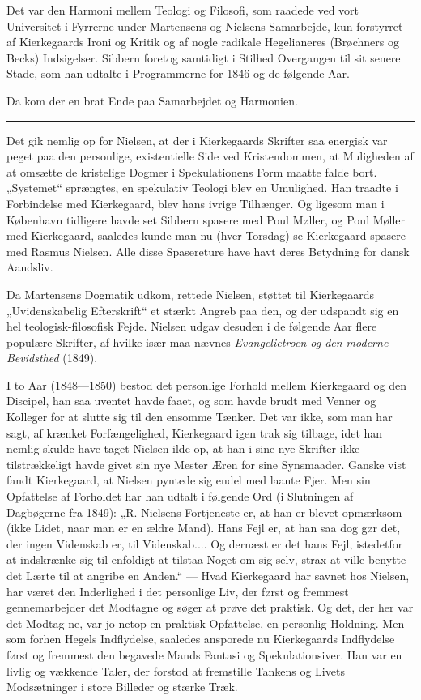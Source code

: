 \documentclass[12pt,a4paper,openany]{book}
\newcommand{\opage}[1]{\marginnote{\footnotesize\textit{[#1]}}}
\begin{document}
Det var den Harmoni mellem Teologi og Filosofi, som raadede ved vort
Universitet i Fyrrerne under Martensens og Nielsens Samarbejde, kun forstyrret
af Kierkegaards Ironi og Kritik og af nogle radikale Hegelianeres (Brøchners og
Becks) Indsigelser. Sibbern foretog samtidigt i Stilhed Overgangen til sit
senere Stade, som han udtalte i Programmerne for 1846 og de følgende Aar.

Da kom der en brat Ende paa Samarbejdet og Harmonien.

\begin{center}\rule{2cm}{0.4pt}\end{center}

\setcounter{footnote}{0}%
\opage{187}Det gik nemlig op for Nielsen, at der i Kierkegaards Skrifter saa
energisk var peget paa den personlige, existentielle Side ved Kristendommen, at
Muligheden af at omsætte de kristelige Dogmer i Spekulationens Form maatte
falde bort. „Systemet“ sprængtes, en spekulativ Teologi blev en Umulighed. Han
traadte i Forbindelse med Kierkegaard, blev hans ivrige Tilhænger. Og ligesom
man i København tidligere havde set Sibbern spasere med Poul Møller, og Poul
Møller med Kierkegaard, saaledes kunde man nu (hver Torsdag) se Kierkegaard
spasere med Rasmus Nielsen. Alle disse Spasereture have havt deres Betydning
for dansk Aandsliv.

Da Martensens Dogmatik udkom, rettede Nielsen, støttet til Kierkegaards
„Uvidenskabelig Efterskrift“ et stærkt Angreb paa den, og der udspandt sig en
hel teologisk-filosofisk Fejde. Nielsen udgav desuden i de følgende Aar flere
populære Skrifter, af hvilke især maa nævnes \textit{Evangelietroen og den
moderne Bevidsthed} (1849).

I to Aar (1848---1850) bestod det personlige Forhold mellem Kierkegaard og den
Discipel, han saa uventet havde faaet, og som havde brudt med Venner og
Kolleger for at slutte sig til den ensomme Tænker. Det var ikke, som man har
sagt, af krænket Forfængelighed, Kierkegaard igen trak sig tilbage, idet han
nemlig skulde have taget Nielsen ilde op, at han i sine nye Skrifter ikke
tilstrækkeligt havde givet sin nye Mester Æren for sine Synsmaader. Ganske vist
fandt Kierkegaard, at Nielsen pyntede sig endel med laante Fjer. Men sin
Opfattelse af Forholdet har han udtalt i følgende Ord (i Slutningen af
Dagbøgerne fra 1849): „R. Nielsens Fortjeneste er, at han er blevet opmærksom
(ikke Lidet, naar man er en ældre Mand). Hans Fejl er, at han saa dog gør det,
der ingen Videnskab er, til Videnskab.... Og dernæst er det hans Fejl,
istedetfor at indskrænke sig til enfoldigt at tilstaa Noget om sig selv, strax
at ville benytte det Lærte til at angribe en Anden.“ --- Hvad Kierkegaard har
savnet hos Nielsen, har været den Inderlighed i det personlige Liv, der først
og fremmest gennemarbejder det Modtagne og søger at prøve det praktisk. Og det,
der her var det Modtag%
\setcounter{footnote}{0}%
\opage{188}ne, var jo netop en praktisk Opfattelse, en personlig Holdning. Men
som forhen Hegels Indflydelse, saaledes ansporede nu Kierkegaards Indflydelse
først og fremmest den begavede Mands Fantasi og Spekulationsiver. Han var en
livlig og vækkende Taler, der forstod at fremstille Tankens og Livets
Modsætninger i store Billeder og stærke Træk.
\end{document}
